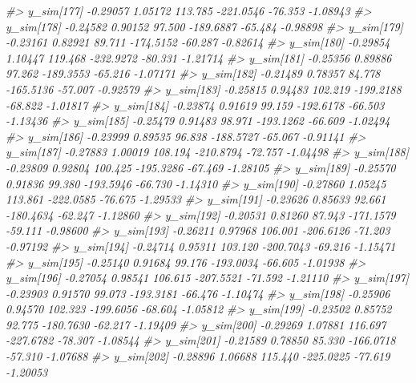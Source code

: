 \documentclass[
  10pt,
  italian,
  a4paper,
  extrafontsizes,onecolumn,openright
  ]{memoir}
\newenvironment{Shaded}{\begin{snugshade}}{\end{snugshade}}
\newcommand{\CommentTok}[1]{\textcolor[rgb]{0.56,0.35,0.01}{\textit{#1}}}
\begin{document}
\begin{Shaded}
\begin{Highlighting}[]
\CommentTok{\#\textgreater{} y\_sim[177] {-}0.29057 1.05172 113.785 {-}221.0546 {-}76.353 {-}1.08943}
\CommentTok{\#\textgreater{} y\_sim[178] {-}0.24582 0.90152  97.500 {-}189.6887 {-}65.484 {-}0.98898}
\CommentTok{\#\textgreater{} y\_sim[179] {-}0.23161 0.82921  89.711 {-}174.5152 {-}60.287 {-}0.82614}
\CommentTok{\#\textgreater{} y\_sim[180] {-}0.29854 1.10447 119.468 {-}232.9272 {-}80.331 {-}1.21714}
\CommentTok{\#\textgreater{} y\_sim[181] {-}0.25356 0.89886  97.262 {-}189.3553 {-}65.216 {-}1.07171}
\CommentTok{\#\textgreater{} y\_sim[182] {-}0.21489 0.78357  84.778 {-}165.5136 {-}57.007 {-}0.92579}
\CommentTok{\#\textgreater{} y\_sim[183] {-}0.25815 0.94483 102.219 {-}199.2188 {-}68.822 {-}1.01817}
\CommentTok{\#\textgreater{} y\_sim[184] {-}0.23874 0.91619  99.159 {-}192.6178 {-}66.503 {-}1.13436}
\CommentTok{\#\textgreater{} y\_sim[185] {-}0.25479 0.91483  98.971 {-}193.1262 {-}66.609 {-}1.02494}
\CommentTok{\#\textgreater{} y\_sim[186] {-}0.23999 0.89535  96.838 {-}188.5727 {-}65.067 {-}0.91141}
\CommentTok{\#\textgreater{} y\_sim[187] {-}0.27883 1.00019 108.194 {-}210.8794 {-}72.757 {-}1.04498}
\CommentTok{\#\textgreater{} y\_sim[188] {-}0.23809 0.92804 100.425 {-}195.3286 {-}67.469 {-}1.28105}
\CommentTok{\#\textgreater{} y\_sim[189] {-}0.25570 0.91836  99.380 {-}193.5946 {-}66.730 {-}1.14310}
\CommentTok{\#\textgreater{} y\_sim[190] {-}0.27860 1.05245 113.861 {-}222.0585 {-}76.675 {-}1.29533}
\CommentTok{\#\textgreater{} y\_sim[191] {-}0.23626 0.85633  92.661 {-}180.4634 {-}62.247 {-}1.12860}
\CommentTok{\#\textgreater{} y\_sim[192] {-}0.20531 0.81260  87.943 {-}171.1579 {-}59.111 {-}0.98600}
\CommentTok{\#\textgreater{} y\_sim[193] {-}0.26211 0.97968 106.001 {-}206.6126 {-}71.203 {-}0.97192}
\CommentTok{\#\textgreater{} y\_sim[194] {-}0.24714 0.95311 103.120 {-}200.7043 {-}69.216 {-}1.15471}
\CommentTok{\#\textgreater{} y\_sim[195] {-}0.25140 0.91684  99.176 {-}193.0034 {-}66.605 {-}1.01938}
\CommentTok{\#\textgreater{} y\_sim[196] {-}0.27054 0.98541 106.615 {-}207.5521 {-}71.592 {-}1.21110}
\CommentTok{\#\textgreater{} y\_sim[197] {-}0.23903 0.91570  99.073 {-}193.3181 {-}66.476 {-}1.10474}
\CommentTok{\#\textgreater{} y\_sim[198] {-}0.25906 0.94570 102.323 {-}199.6056 {-}68.604 {-}1.05812}
\CommentTok{\#\textgreater{} y\_sim[199] {-}0.23502 0.85752  92.775 {-}180.7630 {-}62.217 {-}1.19409}
\CommentTok{\#\textgreater{} y\_sim[200] {-}0.29269 1.07881 116.697 {-}227.6782 {-}78.307 {-}1.08544}
\CommentTok{\#\textgreater{} y\_sim[201] {-}0.21589 0.78850  85.330 {-}166.0718 {-}57.310 {-}1.07688}
\CommentTok{\#\textgreater{} y\_sim[202] {-}0.28896 1.06688 115.440 {-}225.0225 {-}77.619 {-}1.20053}

\end{Highlighting}
\end{Shaded}
\end{document}
